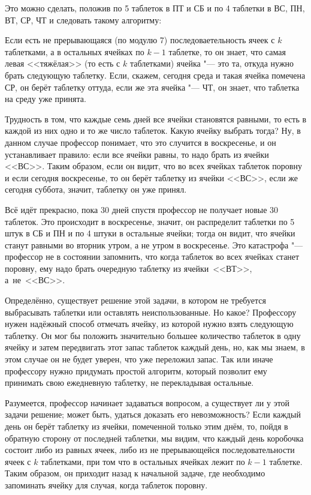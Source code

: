 \documentclass[twoside]{book}
\begin{document}
Это можно сделать, положив по 5 таблеток в ПТ и СБ и по 4 таблетки в ВС, ПН, ВТ, СР, ЧТ и следовать такому ал\-го\-ритму:

\medskip
Если есть не прерывающаяся (по модулю 7) последоваетельность ячеек с $k$ таблетками, а в остальных ячейках по $k-1$ таблетке, то он знает, что самая левая <<тяжёлая>> (то есть с $k$ таблетками) ячейка "--- это та, откуда нужно брать следующую таблетку.
Если, скажем, сегодня среда и такая ячейка помечена СР, он берёт
таблетку оттуда, если же эта ячейка "--- ЧТ, он знает, что таблетка на
среду уже принята.

\medskip
Трудность в том, что каждые семь дней все ячейки становятся равными, то есть в каждой из них одно и то же число таблеток.
Какую ячейку выбрать тогда?
Ну, в данном случае профессор понимает, что это случится в
воскресенье, и он устанавливает правило: если все ячейки равны, то
надо брать из ячейки  <<ВС>>.
Таким образом, если он видит, что во всех ячейках таблеток поровну и
если сегодня воскресенье, то он берёт таблетку из ячейки <<ВС>>, если же сегодня суббота, значит, таблетку он уже принял.

Всё идёт прекрасно, пока 30 дней спустя профессор не получает новые 30 таблеток.
Это происходит в воскресенье, значит, он распределит таблетки по 5 штук в СБ и ПН и по 4 штуки в остальные ячейки;
тогда он видит, что ячейки станут равными во вторник утром, а не утром в воскресенье.
Это катастрофа "--- профессор не в состоянии запомнить, что когда
таблеток во всех ячейках станет поровну, ему надо брать очередную
таблетку из ячейки~<<ВТ>>, а~не~<<ВС>>.

Определённо, существует решение этой задачи, в котором не требуется
выбрасывать таблетки или оставлять неиспользованные.
Но какое? Профессору нужен надёжный способ отмечать ячейку, из которой нужно взять следующую таблетку.
Он мог бы положить значительно большее количество таблеток в одну
ячейку и затем передвигать этот запас таблеток каждый день, но, как мы знаем, в этом случае он не будет уверен, что уже переложил запас.
Так или иначе профессору нужно придумать простой алгоритм, который позволит ему принимать свою ежедневную таблетку, не перекладывая остальные.

Разумеется, профессор начинает задаваться вопросом, а существует ли у этой задачи решение;
может быть, удаться доказать его невозможность?
Если каждый день он берёт таблетку из ячейки, помеченной только этим
днём, то, пойдя в обратную сторону от последней таблетки, мы видим,
что каждый день коробочка состоит либо из равных ячеек, либо из не
прерывающейся последовательности ячеек с $k$ таблетками, при том что в
остальных ячейках лежит по $k-1$ таблетке.
Таким образом, он приходит назад к начальной задаче, где необходимо
запоминать ячейку для случая, когда таблеток поровну.
\end{document}
